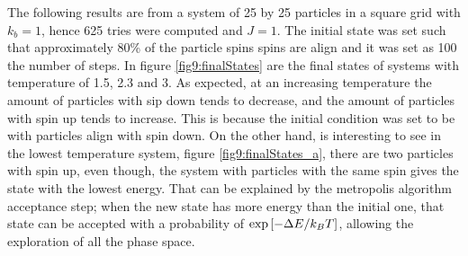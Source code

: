\documentclass[main.tex]{subfiles}
\begin{document}
The following results are from a system of 25 by 25 particles in a square grid with $k_b = 1$, hence 625 tries were computed and $J=1$.
The initial state was set such that approximately 80\% of the particle spins spins are align and it was set as 100 the number of steps.
In figure \ref{fig9:finalStates} are the final states of systems with temperature of 1.5, 2.3 and 3.
As expected, at an increasing temperature the amount of particles with sip down tends to decrease, and the amount of particles with spin up tends to increase.
This is because the initial condition was set to be with particles align with spin down.
On the other hand, is interesting to see in the lowest temperature system, figure \ref{fig9:finalStates_a}, there are two particles with spin up, even though, the system with particles with the same spin gives the state with the lowest energy.
That can be explained by the metropolis algorithm acceptance step; when the new state has more energy than the initial one, that state can be accepted with a probability of $\exp\qty[-\Delta E/k_BT]$, allowing the exploration of all the phase space.
\end{document}
